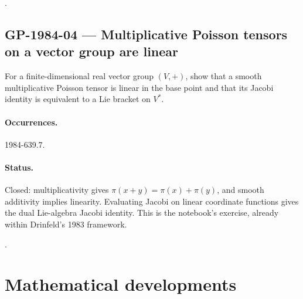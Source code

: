 \noindent\citep{adler1982kowalewski,adler1987quadrics}.

\subsection{GP-1984-04 --- Multiplicative Poisson tensors on a vector group are linear}

\label{problem:GP-1984-04}

For a finite-dimensional real vector group \((V,+)\), show that a smooth multiplicative Poisson tensor is linear in the base point and that its Jacobi identity is equivalent to a Lie bracket on \(V^*\).

\paragraph{Occurrences.} 1984-639.7.

\paragraph{Status.} Closed: multiplicativity gives \(\pi(x+y)=\pi(x)+\pi(y)\), and smooth additivity implies linearity. Evaluating Jacobi on linear coordinate functions gives the dual Lie-algebra Jacobi identity. This is the notebook's exercise, already within Drinfeld's 1983 framework.

\noindent\citep{drinfeld1983hamiltonian}.

\section{Mathematical developments}


